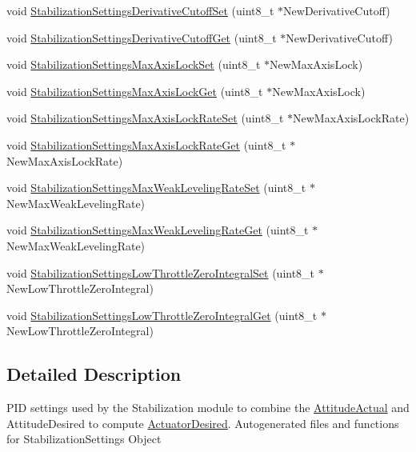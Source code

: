 \begin{DoxyCompactItemize}
void \hyperlink{group___stabilization_settings_ga42811bdc3e4fbac97ab8fee7b5864cc5}{\-Stabilization\-Settings\-Derivative\-Cutoff\-Set} (uint8\-\_\-t $\ast$\-New\-Derivative\-Cutoff)
\item 
void \hyperlink{group___stabilization_settings_ga89097f1691b76954d6e7830b94eb8d21}{\-Stabilization\-Settings\-Derivative\-Cutoff\-Get} (uint8\-\_\-t $\ast$\-New\-Derivative\-Cutoff)
\item 
void \hyperlink{group___stabilization_settings_ga1eebc2f81a9be39ad09d68b37d7eee8a}{\-Stabilization\-Settings\-Max\-Axis\-Lock\-Set} (uint8\-\_\-t $\ast$\-New\-Max\-Axis\-Lock)
\item 
void \hyperlink{group___stabilization_settings_gaf5f47bd9aa90a614b3fce1deb92268e4}{\-Stabilization\-Settings\-Max\-Axis\-Lock\-Get} (uint8\-\_\-t $\ast$\-New\-Max\-Axis\-Lock)
\item 
void \hyperlink{group___stabilization_settings_gafab96036dc5935ac009f822bef449728}{\-Stabilization\-Settings\-Max\-Axis\-Lock\-Rate\-Set} (uint8\-\_\-t $\ast$\-New\-Max\-Axis\-Lock\-Rate)
\item 
void \hyperlink{group___stabilization_settings_ga2eb6bb74abb30f2802c9f68413a33701}{\-Stabilization\-Settings\-Max\-Axis\-Lock\-Rate\-Get} (uint8\-\_\-t $\ast$\-New\-Max\-Axis\-Lock\-Rate)
\item 
void \hyperlink{group___stabilization_settings_ga94fca84d75456fcf28885d5e5ff43201}{\-Stabilization\-Settings\-Max\-Weak\-Leveling\-Rate\-Set} (uint8\-\_\-t $\ast$\-New\-Max\-Weak\-Leveling\-Rate)
\item 
void \hyperlink{group___stabilization_settings_ga549fe6c494e63b1b166c3dd94c570597}{\-Stabilization\-Settings\-Max\-Weak\-Leveling\-Rate\-Get} (uint8\-\_\-t $\ast$\-New\-Max\-Weak\-Leveling\-Rate)
\item 
void \hyperlink{group___stabilization_settings_ga342b271999f033986edb9222e235ecc7}{\-Stabilization\-Settings\-Low\-Throttle\-Zero\-Integral\-Set} (uint8\-\_\-t $\ast$\-New\-Low\-Throttle\-Zero\-Integral)
\item 
void \hyperlink{group___stabilization_settings_ga029f4be31c3b456e9f31fea019658c93}{\-Stabilization\-Settings\-Low\-Throttle\-Zero\-Integral\-Get} (uint8\-\_\-t $\ast$\-New\-Low\-Throttle\-Zero\-Integral)
\end{DoxyCompactItemize}


\subsection{\-Detailed \-Description}
\-P\-I\-D settings used by the \-Stabilization module to combine the \hyperlink{group___attitude_actual}{\-Attitude\-Actual} and \-Attitude\-Desired to compute \hyperlink{group___actuator_desired}{\-Actuator\-Desired}. \-Autogenerated files and functions for \-Stabilization\-Settings \-Object 

